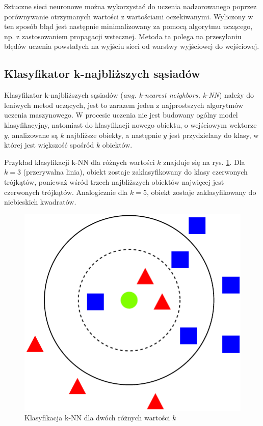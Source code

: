 Sztuczne sieci neuronowe można wykorzystać do uczenia nadzorowanego poprzez porównywanie otrzymanych wartości z wartościami oczekiwanymi. Wyliczony w ten sposób błąd jest następnie minimalizowany za pomocą algorytmu uczącego, np. z zastosowaniem propagacji wstecznej. Metoda ta polega na przesyłaniu błędów uczenia powstałych na wyjściu sieci od warstwy wyjściowej do wejściowej.
	
\subsection{Klasyfikator k-najbliższych sąsiadów}
Klasyfikator k-najbliższych sąsiadów (\emph{ang. k-nearest neighbors, k-NN}) należy do leniwych metod uczących, jest to zarazem jeden z najprostszych algorytmów uczenia maszynowego. W procesie uczenia nie jest budowany ogólny model klasyfikacyjny, natomiast do klasyfikacji nowego obiektu, o wejściowym wektorze $y$, analizowane są $k$ najbliższe obiekty, a następnie $y$ jest przydzielany do klasy, w której jest większość spośród $k$ obiektów.\cite{HAND01}

Przykład klasyfikacji k-NN dla różnych wartości $k$ znajduje się na rys. \ref{fig:knn-example}. Dla $k=3$ (przerywalna linia), obiekt zostaje zaklasyfikowany do klasy czerwonych trójkątów, ponieważ wśród trzech najbliższych obiektów najwięcej jest czerwonych trójkątów. Analogicznie dla $k=5$, obiekt zostaje zaklasyfikowany do niebieskich kwadratów.

\begin{figure}[h]
	\centering
	\includegraphics[scale=1.0]{graphics/01_podstawy_teoretyczne/knn-example.pdf}
	\caption{ Klasyfikacja k-NN dla dwóch różnych wartości $k$ \cite{AJANKI07} }
	\label{fig:knn-example}
\end{figure}

